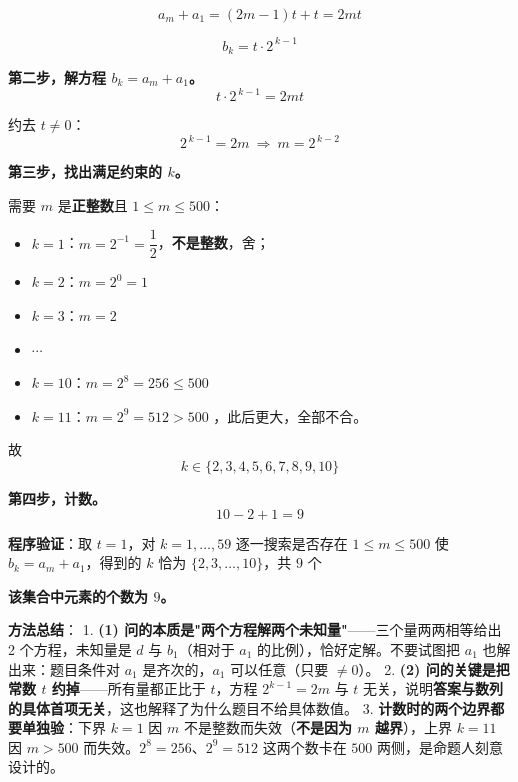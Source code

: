 \begin{answer}
\nopagebreak[4]
\[a_m+a_1=(2m-1)t+t=2mt\]

\nopagebreak[4]
\[b_k=t\cdot2^{\,k-1}\]

\textbf{第二步，解方程 $b_k=a_m+a_1$。}
\nopagebreak[4]
\[t\cdot2^{\,k-1}=2mt\]

约去 $t\ne0$：
\nopagebreak[4]
\[2^{\,k-1}=2m\ \Longrightarrow\ m=2^{\,k-2}\]

\textbf{第三步，找出满足约束的 $k$。}

需要 $m$ 是\textbf{正整数}且 $1\le m\le500$：

\begin{itemize}
\item $k=1$：$m=2^{-1}=\dfrac12$，\textbf{不是整数}，舍；
\item $k=2$：$m=2^{0}=1$ 
\item $k=3$：$m=2$ 
\item $\cdots$
\item $k=10$：$m=2^{8}=256\le500$ 
\item $k=11$：$m=2^{9}=512>500$ ，此后更大，全部不合。
\end{itemize}

故
\nopagebreak[4]
\[k\in\{2,3,4,5,6,7,8,9,10\}\]

\textbf{第四步，计数。}
\nopagebreak[4]
\[10-2+1=9\]

\textbf{程序验证}：取 $t=1$，对 $k=1,\dots,59$ 逐一搜索是否存在 $1\le m\le500$ 使 $b_k=a_m+a_1$，得到的 $k$ 恰为 $\{2,3,\dots,10\}$，共 $9$ 个 

\textbf{该集合中元素的个数为 $9$。}

\begin{gktip}
\textbf{方法总结}：
1. \textbf{(1) 问的本质是"两个方程解两个未知量"}——三个量两两相等给出 2 个方程，未知量是 $d$ 与 $b_1$（相对于 $a_1$ 的比例），恰好定解。不要试图把 $a_1$ 也解出来：题目条件对 $a_1$ 是齐次的，$a_1$ 可以任意（只要 $\ne0$）。
2. \textbf{(2) 问的关键是把常数 $t$ 约掉}——所有量都正比于 $t$，方程 $2^{k-1}=2m$ 与 $t$ 无关，说明\textbf{答案与数列的具体首项无关}，这也解释了为什么题目不给具体数值。
3. \textbf{计数时的两个边界都要单独验}：下界 $k=1$ 因 $m$ 不是整数而失效（\textbf{不是因为 $m$ 越界}），上界 $k=11$ 因 $m>500$ 而失效。$2^{8}=256$、$2^{9}=512$ 这两个数卡在 $500$ 两侧，是命题人刻意设计的。
\end{gktip}



\par\medskip

\end{answer}
